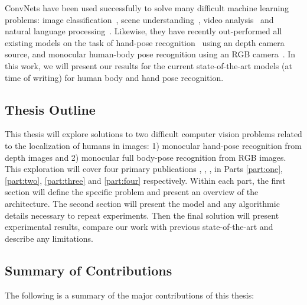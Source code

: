 ConvNets have been used successfully to solve many difficult machine learning
problems: image classification~\cite{pedestrianCVPR13, overfeatSermanet,
ImageNet_NIPS2012_0534, googlenet}, scene understanding~\cite{Farabet}, video
analysis~\cite{KarpathyCVPR14} and natural language
processing~\cite{ilya_sequence,cho_emnlp_2014}. Likewise, they have recently
out-performed all existing models on the task of hand-pose
recognition~\cite{tompsonTOG14} using an depth camera source, and monocular
human-body pose recognition using an RGB camera~\cite{tompsonnips2014,
arjunaccv2014, jainiclr2014, deeppose, chennips2014, tompson_efficient}. In
this work, we will present our results for the current state-of-the-art models
(at time of writing) for human body and hand pose recognition.

\subsection*{Thesis Outline}

This thesis will explore solutions to two difficult computer vision problems
related to the localization of humans in images: 1) monocular hand-pose
recognition from depth images and 2) monocular full body-pose recognition from
RGB images. This exploration will cover four primary publications
\cite{tompsonTOG14}, \cite{tompsonnips2014}, \cite{arjunaccv2014},
\cite{tompson_efficient} in Parts \ref{part:one}, \ref{part:two},
\ref{part:three} and \ref{part:four} respectively. Within each part, the first
section will define the specific problem and present an overview of the
architecture. The second section will present the model and any algorithmic
details necessary to repeat experiments. Then the final solution will present
experimental results, compare our work with previous state-of-the-art and
describe any limitations.

\subsection*{Summary of Contributions}

The following is a summary of the major contributions of this thesis:

